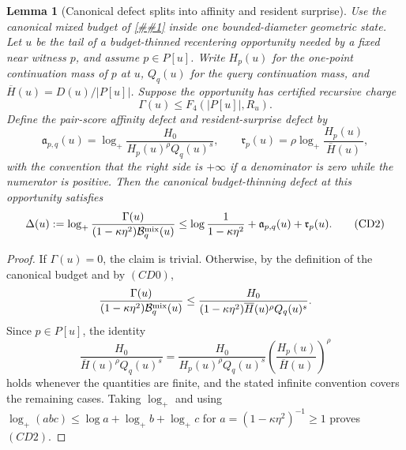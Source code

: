 \documentclass[10pt]{article}
\newcommand{\cref}[1]{\ref{##1}}
\newtheorem{lemma}[theorem]{Lemma}
\theoremstyle{definition}
\begin{document}
\begin{lemma}[Canonical defect splits into affinity and resident surprise]
   \label{lem:canonical-defect-splitting}
   Use the canonical mixed budget of
   \cref{lem:canonical-mixed-budget} inside one bounded-diameter geometric
   state.  Let \(u\) be the tail of a budget-thinned recentering opportunity
   needed by a fixed near witness \(p\), and assume \(p\in P[u]\).  Write
   \(H_p(u)\) for the one-point continuation mass of \(p\) at \(u\),
   \(Q_q(u)\) for the query continuation mass, and
   \(\overline H(u)=D(u)/|P[u]|\).  Suppose the opportunity has certified
   recursive charge
   \[
      \Gamma(u)\le F_4(|P[u]|,R_u).
      \tag{CD0}
   \]
   Define the pair-score affinity defect and resident-surprise defect by
   \[
      \mathfrak a_{p,q}(u)
      =
      \log_+
      \frac{H_0}{H_p(u)^\rho Q_q(u)^s},
      \qquad
      \mathfrak r_p(u)
      =
      \rho\log_+
      \frac{H_p(u)}{\overline H(u)} ,
      \tag{CD1}
   \]
   with the convention that the right side is \(+\infty\) if a denominator is
   zero while the numerator is positive.  Then the canonical budget-thinning
   defect at this opportunity satisfies
   \[
      \Delta(u):=
      \log_+
      \frac{\Gamma(u)}
           {(1-\kappa\eta^2)\mathcal B_q^{\rm mix}(u)}
      \le
      \log\frac1{1-\kappa\eta^2}
      +
      \mathfrak a_{p,q}(u)
      +
      \mathfrak r_p(u).
      \tag{CD2}
   \]
\end{lemma}

\begin{proof}
   If \(\Gamma(u)=0\), the claim is trivial.  Otherwise, by the definition of
   the canonical budget and by \((CD0)\),
   \[
      \frac{\Gamma(u)}
           {(1-\kappa\eta^2)\mathcal B_q^{\rm mix}(u)}
      \le
      \frac{H_0}
           {(1-\kappa\eta^2)\overline H(u)^\rho Q_q(u)^s}.
   \]
   Since \(p\in P[u]\), the identity
   \[
      \frac{H_0}
           {\overline H(u)^\rho Q_q(u)^s}
      =
      \frac{H_0}{H_p(u)^\rho Q_q(u)^s}
      \left(\frac{H_p(u)}{\overline H(u)}\right)^\rho
   \]
   holds whenever the quantities are finite, and the stated infinite
   convention covers the remaining cases.  Taking \(\log_+\) and using
   \(\log_+(abc)\le\log a+\log_+b+\log_+c\) for
   \(a=(1-\kappa\eta^2)^{-1}\ge1\) proves \((CD2)\).
\end{proof}
\end{document}
